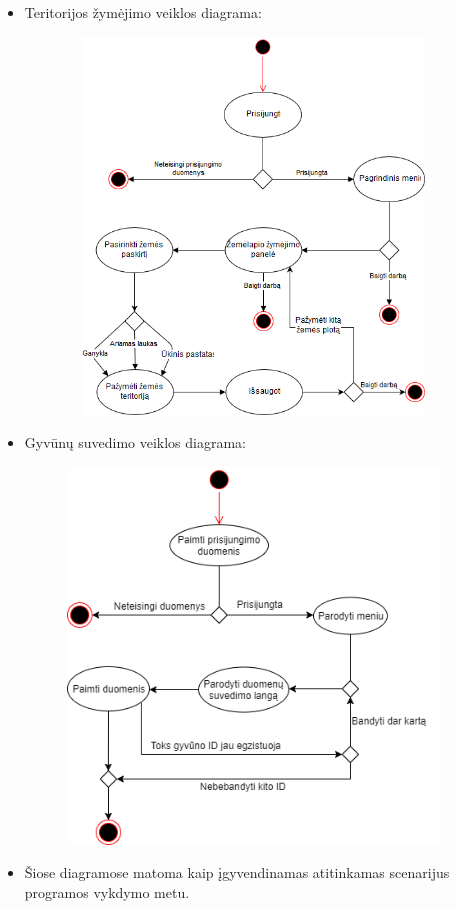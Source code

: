 \documentclass[oneside]{VUMIFPSkursinis}
\begin{document}
\begin{itemize}
\begin{figure}[H]
	\caption{}
	\label{}
	\end{figure}
\item Teritorijos žymėjimo veiklos diagrama:
	\begin{figure}[H]
	\centering	
	\includegraphics[width=10cm,height=10cm,keepaspectratio]{veiklos_diagrama_zymeti_teritorijas.png}
	\caption{}
	\label{}
	\end{figure}
\item Gyvūnų suvedimo veiklos diagrama:
	\begin{figure}[H]
	\centering	
	\includegraphics[width=10cm,height=10cm,keepaspectratio]{VeiklosGyvunuSuvedimas.png}
	\caption{}
	\label{}
	\end{figure}
\item Šiose diagramose matoma kaip įgyvendinamas atitinkamas scenarijus programos vykdymo metu.
\end{itemize}
\end{document}
